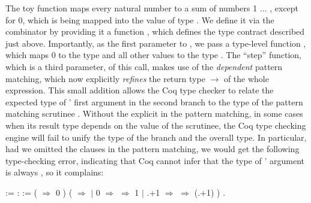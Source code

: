\coqdocemptyline


The toy function  maps every natural number  to a sum
of numbers 1 ... , except for 0, which is being mapped into the
value  of type . We define it via the  combinator
by providing it a function , which defines the type contract
described just above.  Importantly, as the first parameter to
, we pass a type-level function , which maps 0 to the
 type and all other values to the type . The ``step''
function, which is a third parameter, of this  call, makes
use of the \textit{dependent} pattern matching, which now explicitly
\textit{refines} the return type   \ensuremath{\rightarrow} \coqdocvar{\_} of the whole    
 expression. This small addition allows the Coq type checker to
relate the expected type of ' first argument in the second
branch to the type of the pattern matching scrutinee . Without
the explicit  in the pattern matching, in some cases when its
result type depends on the value of the scrutinee, the Coq type
checking engine will fail to unify the type of the branch and the
overall type. In particular, had we omitted the  clauses in
the pattern matching, we would get the following type-checking error,
indicating that Coq cannot infer that the type of ' argument
is always , so it complains:


\coqdoceol
\coqdocemptyline
\coqdocnoindent
{}   := \coqdoceol
\coqdocindent{0.50em}
:  := (  \ensuremath{\Rightarrow}    0    ) \coqdoceol
\coqdocindent{0.50em}
   (   \ensuremath{\Rightarrow} \coqdoceol
\coqdocnoindent
{}  \coqdoceol
\coqdocindent{1.50em}
\ensuremath{|} 0 \ensuremath{\Rightarrow}  \coqdocvar{\_} \ensuremath{\Rightarrow} 1\coqdoceol
\coqdocindent{1.50em}
\ensuremath{|} .+1 \ensuremath{\Rightarrow}   \ensuremath{\Rightarrow}   (.+1) \coqdoceol
\coqdocnoindent
{} ) .

